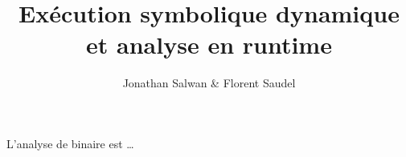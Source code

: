 \documentclass[a4paper]{report}
\begin{document}
\title{Exécution symbolique dynamique et analyse en \og runtime \fg}
\author{Jonathan Salwan \& Florent Saudel}

\maketitle

\abstract
L'analyse de binaire est \ldots

\nocite{*}

{}
\end{document}
